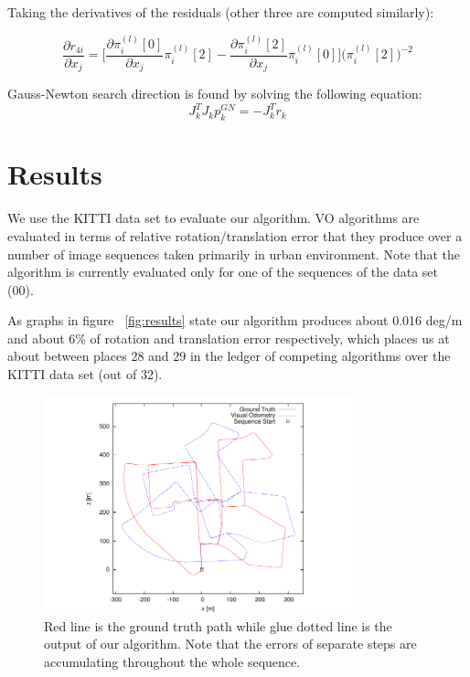 \documentclass[10pt]{article}         %
\begin{document}
Taking the derivatives of the residuals (other three are computed similarly):

$$
  \frac{\partial r_{4i}}{\partial x_j} = \Bigg[\frac{\partial \pi_i^{(l)}[0]}{\partial x_j}\pi_i^{(l)}[2]-\frac{\partial \pi_i^{(l)}[2]}{\partial x_j}\pi_i^{(l)}[0]\Bigg]\Big(\pi_i^{(l)}[2]\Big)^{-2}
$$

Gauss-Newton search direction is found by solving the following equation:
$$
J_k^TJ_kp_k^{GN}=-J_k^Tr_k
$$
\section{Results}

We use the KITTI data set \cite{Geiger2012CVPR} to evaluate our algorithm. VO algorithms are evaluated in terms of relative rotation/translation error that they produce over a number of image sequences taken primarily in urban environment.  Note that the algorithm is currently evaluated only for one of the sequences of the data set (00). 

As graphs in figure ~\ref{fig:results} state our algorithm produces about 0.016 deg/m and about 6\% of rotation and translation error respectively, which places us at about between places 28 and 29 in the ledger of competing algorithms over the KITTI data set (out of 32).

\begin{figure}[h]
    \centering
    \includegraphics[width=0.8\textwidth]{00}
    \caption{Red line is the ground truth path while glue dotted line is the output of our algorithm.  Note that the errors of separate steps are accumulating throughout the whole sequence.}
    \label{fig:stereo_match}
\end{figure}
\end{document}
